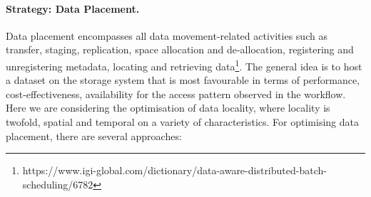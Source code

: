 \documentclass{superfri}
\begin{document}
\paragraph{Strategy: Data Placement.}

Data placement encompasses all data movement-related activities such as transfer, staging, replication, space allocation and de-allocation, registering and unregistering metadata, locating and retrieving data\footnote{https://www.igi-global.com/dictionary/data-aware-distributed-batch-scheduling/6782}.
The general idea is to host a dataset on the storage system that is most favourable in terms of performance, cost-effectiveness, availability for the access pattern observed in the workflow.
Here we are considering the optimisation of data locality, where locality is twofold, spatial and temporal on a variety of characteristics.
For optimising data placement, there are several approaches:
\end{document}
